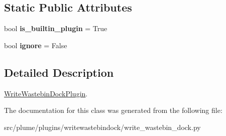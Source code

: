 \subsection*{Static Public Attributes}
\begin{DoxyCompactItemize}
\item 
bool {\bfseries is\+\_\+builtin\+\_\+plugin} = True\hypertarget{classplume-creator_1_1src_1_1plume_1_1plugins_1_1writewastebindock_1_1write__wastebin__dock_1_1_write_wastebin_dock_plugin_a660e475681360004d0aec343dad5e1c7}{}\label{classplume-creator_1_1src_1_1plume_1_1plugins_1_1writewastebindock_1_1write__wastebin__dock_1_1_write_wastebin_dock_plugin_a660e475681360004d0aec343dad5e1c7}

\item 
bool {\bfseries ignore} = False\hypertarget{classplume-creator_1_1src_1_1plume_1_1plugins_1_1writewastebindock_1_1write__wastebin__dock_1_1_write_wastebin_dock_plugin_a6c3a3fa527416452ecf99f6eff7d06b1}{}\label{classplume-creator_1_1src_1_1plume_1_1plugins_1_1writewastebindock_1_1write__wastebin__dock_1_1_write_wastebin_dock_plugin_a6c3a3fa527416452ecf99f6eff7d06b1}

\end{DoxyCompactItemize}


\subsection{Detailed Description}
\hyperlink{classplume-creator_1_1src_1_1plume_1_1plugins_1_1writewastebindock_1_1write__wastebin__dock_1_1_write_wastebin_dock_plugin}{Write\+Wastebin\+Dock\+Plugin}. 

The documentation for this class was generated from the following file\+:\begin{DoxyCompactItemize}
\item 
src/plume/plugins/writewastebindock/write\+\_\+wastebin\+\_\+dock.\+py\end{DoxyCompactItemize}
